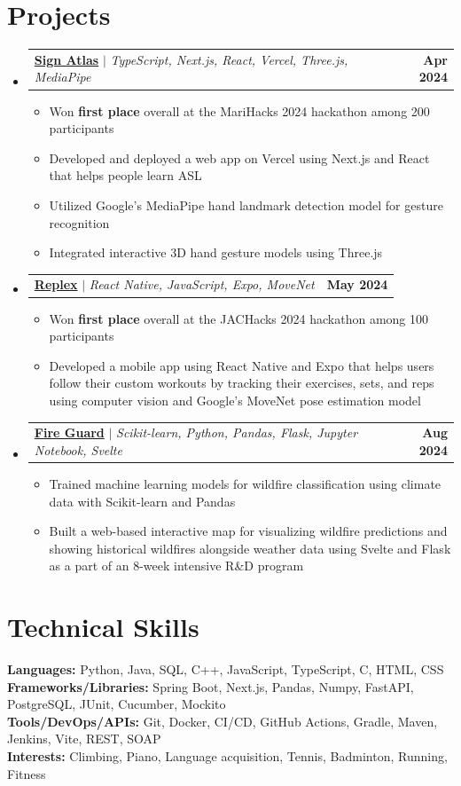 \documentclass[letterpaper,11pt]{article}
\makeatletter
\newcommand{\resumeItem}[1]{
  \item\small{
    {#1 \vspace{-2pt}}
  }
}
\newcommand{\resumeProjectHeading}[4]{
  \item
  \begin{tabular*}{\textwidth}{l@{\extracolsep{\fill}}r}
    \small{\href{#3}{\textbf{#1}\hspace{0.3em}{\faLink}} $|$ \emph{#2}} & \textbf{\small #4} \\
  \end{tabular*}\vspace{-7pt}
}
\newcommand{\resumeSubHeadingListStart}{\begin{itemize}[leftmargin=0in, label={}]}
\newcommand{\resumeSubHeadingListEnd}{\end{itemize}}
\newcommand{\resumeItemListStart}{\begin{itemize}}
\newcommand{\resumeItemListEnd}{\end{itemize}\vspace{-5pt}}
\makeatother
\begin{document}
\section{Projects}
    \resumeSubHeadingListStart
      \resumeProjectHeading
          {Sign Atlas}
          {TypeScript, Next.js, React, Vercel, Three.js, MediaPipe}
          {https://devpost.com/software/sign-atlas}
          {Apr 2024}
          \resumeItemListStart
            \resumeItem{Won \textbf{first place} overall at the MariHacks 2024 hackathon among 200 participants}
            \resumeItem{Developed and deployed a web app on Vercel using Next.js and React that helps people learn ASL}
            \resumeItem{Utilized Google’s MediaPipe hand landmark detection model for gesture recognition}
            \resumeItem{Integrated interactive 3D hand gesture models using Three.js}
          \resumeItemListEnd
      \resumeProjectHeading
          {Replex}
          {React Native, JavaScript, Expo, MoveNet}
          {https://devpost.com/software/replex}
          {May 2024}
          \resumeItemListStart
            \resumeItem{Won \textbf{first place} overall at the JACHacks 2024 hackathon among 100 participants}
            \resumeItem{Developed a mobile app using React Native and Expo that helps users follow their custom workouts by tracking their exercises, sets, and reps using computer vision and Google’s MoveNet pose estimation model}
          \resumeItemListEnd
      \resumeProjectHeading
          {Fire Guard}
          {Scikit-learn, Python, Pandas, Flask, Jupyter Notebook, Svelte}
          {https://github.com/tran-ethan/fire-guard}
          {Aug 2024}
          \resumeItemListStart
            \resumeItem{Trained machine learning models for wildfire classification using climate data with Scikit-learn and Pandas}
            \resumeItem{Built a web-based interactive map for visualizing wildfire predictions and showing historical wildfires alongside weather data using Svelte and Flask as a part of an 8-week intensive R\&D program}
          \resumeItemListEnd
    \resumeSubHeadingListEnd

%
\section{Technical Skills}
 \begin{itemize}[leftmargin=0in, label={}]
    \small{\item{
     \textbf{Languages:}{ Python, Java, SQL, C++, JavaScript, TypeScript, C, HTML, CSS} \\
     \textbf{Frameworks/Libraries:}{ Spring Boot, Next.js, Pandas, Numpy, FastAPI, PostgreSQL, JUnit, Cucumber, Mockito} \\
     \textbf{Tools/DevOps/APIs:}{ Git, Docker, CI/CD, GitHub Actions, Gradle, Maven, Jenkins, Vite, REST, SOAP } \\
     \textbf{Interests:}{ Climbing, Piano, Language acquisition, Tennis, Badminton, Running, Fitness } \\
    }}
 \end{itemize}

\end{document}
